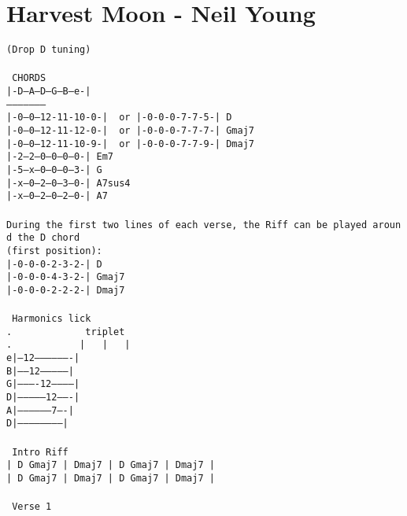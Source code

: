 \newpage
\section{Harvest Moon - Neil Young}
\label{Harvest Moon - Neil Young}
\texttt{(Drop\ D\ tuning)\\
\\
\lbrack\ CHORDS\rbrack\\
|-D--A--D--G--B--e-|\\
--------------------\\
|-0--0--12-11-10-0-|\ \ or\ |-0-0-0-7-7-5-|\ D\ \ \ \\
|-0--0--12-11-12-0-|\ \ or\ |-0-0-0-7-7-7-|\ Gmaj7\\
|-0--0--12-11-10-9-|\ \ or\ |-0-0-0-7-7-9-|\ Dmaj7\\
|-2--2--0--0--0--0-|\ Em7\ \ \\
|-5--x--0--0--0--3-|\ G\ \ \ \\
|-x--0--2--0--3--0-|\ A7sus4\\
|-x--0--2--0--2--0-|\ A7\ \ \\
\\
During\ the\ first\ two\ lines\ of\ each\ verse,\ the\ Riff\ can\ be\ played\ around\ the\ D\ chord\ \\
(first\ position):\\
|-0-0-0-2-3-2-|\ D\ \ \ \\
|-0-0-0-4-3-2-|\ Gmaj7\ \\
|-0-0-0-2-2-2-|\ Dmaj7\ \\
\\
\lbrack\ Harmonics lick\rbrack\\
.\ \ \ \ \ \ \ \ \ \ \ \ \ triplet\\
.\ \ \ \ \ \ \ \ \ \ \ \ | \ \ |\ \ \ |\\
e|--12-------------------|\\
B|------12---------------|\\
G|----------12-----------|\\
D|--------------12-------|\\
A|------------------7----|\\
D|-----------------------|\\
\\
\lbrack\ Intro\ Riff\rbrack\ \ \\
|\ D\ Gmaj7\ |\ Dmaj7\ |\ D\ Gmaj7\ |\ Dmaj7\ |\\
|\ D\ Gmaj7\ |\ Dmaj7\ |\ D\ Gmaj7\ |\ Dmaj7\ |\\
\\
\lbrack\ Verse\ 1\rbrack\\
}
